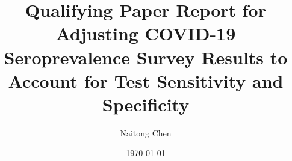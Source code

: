 \documentclass[10pt]{article}
\title{Qualifying Paper Report for Adjusting COVID-19 Seroprevalence Survey Results to Account for Test
Sensitivity and Specificity} %
\author{Naitong Chen} %
\date{\today} %
\begin{document}
\maketitle






\pagebreak



\appendix

\end{document}
